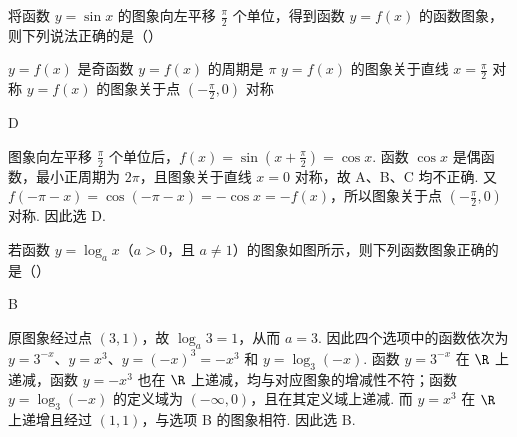 \begin{problem}
将函数 \( y = \sin x \) 的图象向左平移 \( \frac{\pi}{2} \) 个单位，得到函数 \( y = f(x) \) 的函数图象，则下列说法正确的是（\quad）

\choices
    {\(y = f(x)\) 是奇函数}
    {\(y = f(x)\) 的周期是 \(\pi\)}
    {\(y = f(x)\) 的图象关于直线 \(x = \frac{\pi}{2}\) 对称}
    {\(y = f(x)\) 的图象关于点 \(\left(-\frac{\pi}{2},0\right)\) 对称}

\begin{answer}
D
\end{answer}

\begin{solution}
图象向左平移 \(\frac{\pi}{2}\) 个单位后，\(f(x)=\sin\left(x+\frac{\pi}{2}\right)=\cos x\). 函数 \(\cos x\) 是偶函数，最小正周期为 \(2\pi\)，且图象关于直线 \(x=0\) 对称，故 A、B、C 均不正确. 又 \(f(-\pi-x)=\cos(-\pi-x)=-\cos x=-f(x)\)，所以图象关于点 \(\left(-\frac{\pi}{2},0\right)\) 对称. 因此选 D.
\end{solution}
\end{problem}

\begin{problem}
若函数 \( y = \log_a x \)（\(a > 0\)，且 \(a \neq 1\)）的图象如图所示，则下列函数图象正确的是（\quad）


    {}
    {}
    {}

\begin{answer}
B
\end{answer}

\begin{solution}
原图象经过点 \((3,1)\)，故 \(\log_a3=1\)，从而 \(a=3\). 因此四个选项中的函数依次为 \(y=3^{-x}\)、\(y=x^3\)、\(y=(-x)^3=-x^3\) 和 \(y=\log_3(-x)\). 函数 \(y=3^{-x}\) 在 \(\R\) 上递减，函数 \(y=-x^3\) 也在 \(\R\) 上递减，均与对应图象的增减性不符；函数 \(y=\log_3(-x)\) 的定义域为 \((-\infty,0)\)，且在其定义域上递减. 而 \(y=x^3\) 在 \(\R\) 上递增且经过 \((1,1)\)，与选项 B 的图象相符. 因此选 B.
\end{solution}
\end{problem}

